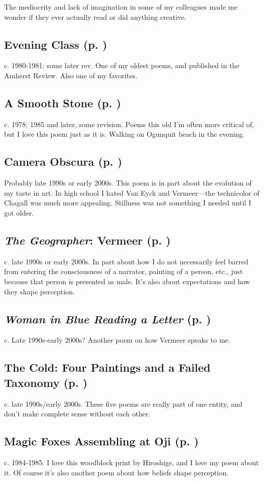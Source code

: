 The mediocrity and lack of imagination in some of my colleagues made me
wonder if they ever actually read or did anything creative.

\subsection*{Evening Class (p. \pageref{ch:evening_class})}
c. 1980-1981: some later rev. One of my oldest poems,
and published in the Amherst Review. Also one of my favorites.

\subsection*{A Smooth Stone (p. \pageref{ch:a_smooth_stone})}
c. 1978; 1985 and later, some revision. Poems this old
I'm often more critical of, but I love this poem just as it is. Walking
on Ogunquit beach in the evening.

\subsection*{Camera Obscura (p. \pageref{ch:camera_obscura})}
Probably late 1990s or early 2000s. This poem is in part
about the evolution of my taste in art. In high school I hated Van Eyck
and Vermeer---the technicolor of Chagall was much more appealing.
Stillness was not something I needed until I got
older.

\subsection*{\textit{The Geographer}: Vermeer (p. \pageref{ch:the_geographer})}
c. late 1990s or early 2000s. In part about how I do not
necessarily feel barred from entering the consciousness of a narrator,
painting of a person, etc., just because that person is presented as
male. It's also about expectations and how they shape
perception.

\subsection*{\textit{Woman in Blue Reading a Letter} (p. \pageref{ch:woman_in_blue})}
c. Late 1990s-early 2000s? Another poem on how Vermeer
speaks to me.

\subsection*{The Cold: Four Paintings and a Failed Taxonomy (p. \pageref{ch:the_cold})}
c. late 1990s/early 2000s. These five poems are really
part of one entity, and don't make complete sense without each other.

\subsection*{Magic Foxes Assembling at Oji (p. \pageref{ch:magic_foxes})}
c. 1984-1985. I love this woodblock print by Hiroshige,
and I love my poem about it. Of course it's also another poem about how
beliefs shape perception.
